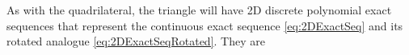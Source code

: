 

As with the quadrilateral, the triangle will have 2D discrete polynomial exact sequences that represent the continuous exact sequence \eqref{eq:2DExactSeq} and its rotated analogue \eqref{eq:2DExactSeqRotated}. 
They are
%
